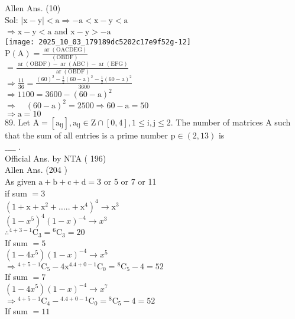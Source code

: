 \documentclass[10pt]{article}
\begin{document}
Allen Ans. (10)\\
Sol: \(|\mathrm{x}-\mathrm{y}|<\mathrm{a} \Rightarrow-\mathrm{a}<\mathrm{x}-\mathrm{y}<\mathrm{a}\)\\
\(\Rightarrow \mathrm{x}-\mathrm{y}<\mathrm{a}\) and \(\mathrm{x}-\mathrm{y}>-\mathrm{a}\)\\
\texttt{[image: 2025\_10\_03\_179189dc5202c17e9f52g-12]}\\
\(\mathrm{P}(\mathrm{A})=\frac{\operatorname{ar}(\mathrm{OACDEG})}{(\mathrm{OBDF})}\)\\
\(=\frac{\operatorname{ar}(\mathrm{OBDF})-\operatorname{ar}(\mathrm{ABC})-\operatorname{ar}(\mathrm{EFG})}{\operatorname{ar}(\mathrm{OBDF})}\)\\
\(\Rightarrow \frac{11}{36}=\frac{(60)^{2}-\frac{1}{2}(60-\mathrm{a})^{2}-\frac{1}{2}(60-\mathrm{a})^{2}}{3600}\)\\
\(\Rightarrow 1100=3600-(60-\mathrm{a})^{2}\)\\
\(\Rightarrow \quad(60-\mathrm{a})^{2}=2500 \Rightarrow 60-\mathrm{a}=50\)\\
\(\Rightarrow \mathrm{a}=10\)\\
89. Let \(\mathrm{A}=\left[\mathrm{a}_{\mathrm{ij}}\right], \mathrm{a}_{\mathrm{ij}} \in \mathrm{Z} \cap[0,4], 1 \leq \mathrm{i}, \mathrm{j} \leq 2\). The number of matrices A such that the sum of all entries is a prime number \(\mathrm{p} \in(2,13)\) is\\
\(\_\_\_\_\) .\\
Official Ans. by NTA ( 196)\\
Allen Ans. (204 )\\
As given \(\mathrm{a}+\mathrm{b}+\mathrm{c}+\mathrm{d}=3\) or 5 or 7 or 11\\
if sum \(=3\)\\
\(\left(1+\mathrm{x}+\mathrm{x}^{2}+\ldots . .+\mathrm{x}^{4}\right)^{4} \rightarrow \mathrm{x}^{3}\)\\
\(\left(1-x^{5}\right)^{4}(1-x)^{-4} \rightarrow x^{3}\)\\
\(\therefore{ }^{4+3-1} \mathrm{C}_{3}={ }^{6} \mathrm{C}_{3}=20\)\\
If sum \(=5\)\\
\(\left(1-4 x^{5}\right)(1-x)^{-4} \rightarrow x^{5}\)\\
\(\Rightarrow{ }^{4+5-1} \mathrm{C}_{5}-4 \mathrm{x}^{4.4+0-1} \mathrm{C}_{0}={ }^{8} \mathrm{C}_{5}-4=52\)\\
If sum \(=7\)\\
\(\left(1-4 x^{5}\right)(1-x)^{-4} \rightarrow x^{7}\)\\
\(\Rightarrow{ }^{4+5-1} \mathrm{C}_{4}-{ }^{4.4+0-1} \mathrm{C}_{0}={ }^{8} \mathrm{C}_{5}-4=52\)\\
If sum \(=11\)
\end{document}
